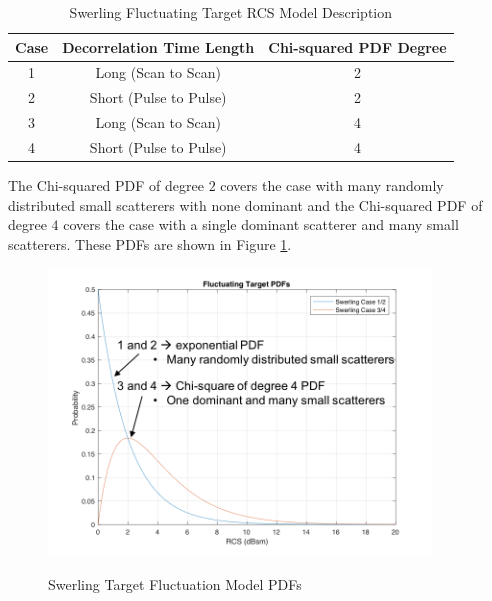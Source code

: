 \begin{table}[H]
  \begin{center}
      \renewcommand{\baselinestretch}{1} \small\normalsize
  \begin{quote}
    \caption[Swerling Fluctuating Target RCS Model Description]{Swerling Fluctuating Target RCS Model Description\label{env_tab:1}}
  \end{quote}
  \begin{tabular} {|c | c | c |}
    \hline
  \bf{Case} & \bf{Decorrelation Time Length} & \bf{Chi-squared PDF Degree} \\ \hline
  1 &Long (Scan to Scan) &2 \\ \hline
  2 &Short (Pulse to Pulse) &2 \\ \hline
  3 &Long (Scan to Scan) &4 \\ \hline
  4 &Short (Pulse to Pulse) &4 \\ \hline
\end{tabular}
\end{center}
\end{table}
\renewcommand{\baselinestretch}{2} \small\normalsize
The Chi-squared PDF of degree $2$ covers the case with many randomly distributed small scatterers with none dominant and the Chi-squared PDF of degree $4$ covers the case with a single dominant scatterer and many small scatterers. These PDFs are shown in Figure \ref{env_fig:3}.
\begin{figure}[H]
  \begin{center}
\includegraphics[width=4in]{../media/multistatic/swerling_pdfs.png}
  \end{center}
  \renewcommand{\baselinestretch}{1} \small\normalsize
  \begin{quote}
    \caption[Swerling Target Fluctuation Model PDFs]{Swerling Target Fluctuation Model PDFs\label{env_fig:3}}
  \end{quote}
\end{figure}
\renewcommand{\baselinestretch}{2} \small\normalsize

